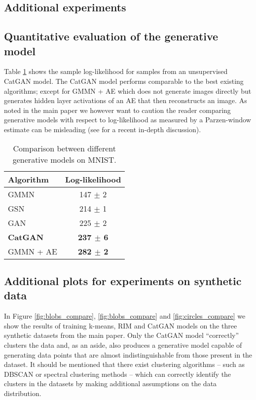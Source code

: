 \documentclass{article} \usepackage{iclr2016_conference,times}
\begin{document}
\begin{appendix}
\section{Additional experiments}

\subsection{Quantitative evaluation of the generative model}
Table \ref{tab:ll_mnist} shows the sample log-likelihood for samples
from an unsupervised CatGAN model.  The CatGAN model performs
comparable to the best existing algorithms; except for GMMN + AE which
does not generate images directly but generates hidden layer
activations of an AE that then reconstructs an image. As noted in the
main paper we however want to caution the reader comparing generative
models with respect to log-likelihood as measured by a Parzen-window
estimate can be misleading (see \cite{Theis_2015} for a recent
in-depth discussion).

\begin{table}[h]
  \begin{center}
  \begin{tabular}{lc}
    \bf Algorithm & Log-likelihood\\
    \hline
    GMMN \citep{Li_2015} & 147 $\pm$ 2 \\
    GSN \citep{Bengio_ICML2014} & 214 $\pm$ 1 \\
    GAN \citep{Goodfellow_NIPS2014} & 225 $\pm$ 2 \\
    \textbf{CatGAN} & \textbf{237 $\pm$ 6} \\
    \hline
    GMMN + AE \citep{Li_2015} & \textbf{282 $\pm$ 2}
  \end{tabular}
\end{center}
\caption{Comparison between different generative models on MNIST.}
\label{tab:ll_mnist}
\end{table}


\subsection{Additional plots for experiments on synthetic data}
In Figure \ref{fig:blobs_compare}, \ref{fig:blobs_compare} and
\ref{fig:circles_compare} we show the results of training k-means, RIM
and CatGAN models on the three synthetic datasets from the main
paper. Only the CatGAN model ``correctly'' clusters the data and, as
an aside, also produces a generative model capable of generating data
points that are almost indistinguishable from those present in the
dataset.  It should be mentioned that there exist clustering
algorithms -- such as DBSCAN \citep{EstKriSanXu96} or spectral clustering
methods -- which can correctly identify the clusters in the datasets
by making additional assumptions on the data distribution.


\end{appendix}
\end{document}
